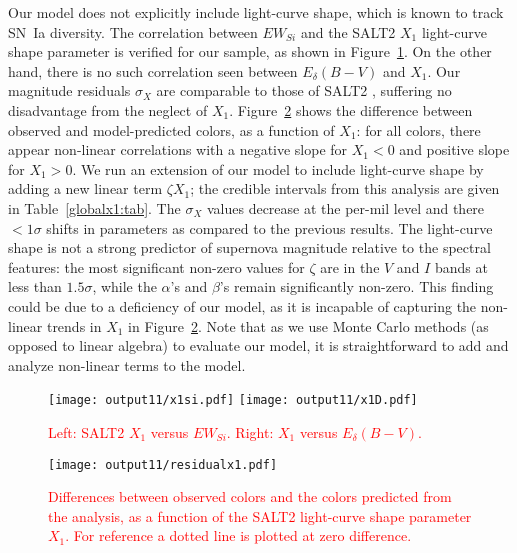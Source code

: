 \documentclass{aastex}   	%
\begin{document}
\color{red}
Our model does not explicitly include light-curve shape, which is known to track SN~Ia diversity.
The correlation between $EW_{Si}$ and the SALT2 $X_1$ light-curve shape parameter is verified
for our sample, as shown in Figure~\ref{x1:fig}.
On the other hand, there is no such correlation seen between $E_\delta(B-V)$ and $X_1$. 
Our magnitude residuals $\sigma_X$ are comparable to those of SALT2
\citep{2010A&A...523A...7G}, suffering no  disadvantage from the neglect of $X_1$.
Figure~\ref{x1res:fig} shows the difference between observed and model-predicted colors,
as a function of $X_1$: for all colors, there appear non-linear correlations 
with a negative slope for $X_1<0$ and positive slope for $X_1>0$.
We  run an extension of our model to include light-curve shape by adding a new linear term $\zeta X_1$; the credible intervals
from this analysis are given in Table~\ref{globalx1:tab}.  
The $\sigma_X$ values decrease at the per-mil level and there $<1\sigma$
shifts in parameters as compared to the previous results. 
The light-curve shape is not a strong predictor of supernova magnitude relative to the spectral features: the most significant non-zero values for
$\zeta$ are in the $V$ and $I$ bands at less than $1.5 \sigma$, while the $\alpha$'s and $\beta$'s remain significantly
non-zero.  This finding could be due to a deficiency of our model, 
as it  is incapable of capturing the non-linear trends in $X_1$ in Figure~\ref{x1res:fig}.
Note that as we use Monte Carlo methods (as opposed to linear algebra) to evaluate our model, 
it is straightforward to add and analyze non-linear terms to the model.
\begin{figure}[htbp] %
   \centering
   \texttt{[image: output11/x1si.pdf]}
   \texttt{[image: output11/x1D.pdf]}
    \caption{\textcolor{red}{Left: SALT2 $X_1$ versus $EW_{Si}$.  Right: $X_1$ versus $E_\delta(B-V)$.}
   \label{x1:fig}}
\end{figure}

\begin{figure}[htbp] %
   \centering
   \texttt{[image: output11/residualx1.pdf]}
    \caption{\textcolor{red}{Differences between observed colors and the colors predicted from the analysis, as a function
            of the SALT2 light-curve shape parameter $X_1$.  For reference a dotted line is plotted at zero difference.}
   \label{x1res:fig}}
\end{figure}
\end{document}
